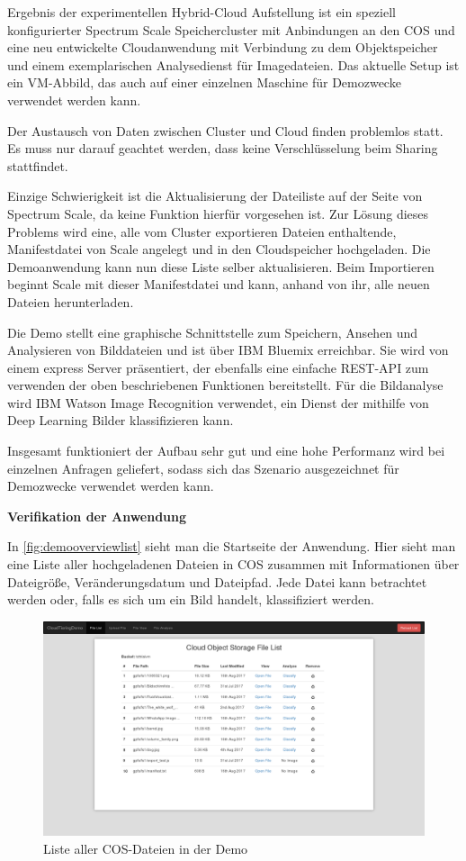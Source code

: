 Ergebnis der experimentellen Hybrid-Cloud Aufstellung ist ein speziell konfigurierter Spectrum Scale Speichercluster mit Anbindungen an den \ac{COS} und eine neu entwickelte Cloudanwendung mit Verbindung zu dem Objektspeicher und einem exemplarischen Analysedienst für Imagedateien.
Das aktuelle Setup ist ein VM-Abbild, das auch auf einer einzelnen Maschine für Demozwecke verwendet werden kann.

Der Austausch von Daten zwischen Cluster und Cloud finden problemlos statt. Es muss nur darauf geachtet werden, dass keine Verschlüsselung beim Sharing stattfindet.

Einzige Schwierigkeit ist die Aktualisierung der Dateiliste auf der Seite von Spectrum Scale, da keine Funktion hierfür vorgesehen ist. Zur Lösung dieses Problems wird eine, alle vom Cluster exportieren Dateien enthaltende, Manifestdatei von Scale angelegt und in den Cloudspeicher hochgeladen. Die Demoanwendung kann nun diese Liste selber aktualisieren. Beim Importieren beginnt Scale mit dieser Manifestdatei und kann, anhand von ihr, alle neuen Dateien herunterladen.

Die Demo stellt eine graphische Schnittstelle zum Speichern, Ansehen und Analysieren von Bilddateien und ist über IBM Bluemix erreichbar. Sie wird von einem express Server präsentiert, der ebenfalls eine einfache REST-API zum verwenden der oben beschriebenen Funktionen bereitstellt. Für die Bildanalyse wird IBM Watson Image Recognition verwendet, ein Dienst der mithilfe von Deep Learning Bilder klassifizieren kann.

Insgesamt funktioniert der Aufbau sehr gut und eine hohe Performanz wird bei einzelnen Anfragen geliefert, sodass sich das Szenario ausgezeichnet für Demozwecke verwendet werden kann.

\textbf{Verifikation der Anwendung}

In \autoref{fig:demooverviewlist} sieht man die Startseite der Anwendung. Hier sieht man eine Liste aller hochgeladenen Dateien in \ac{COS} zusammen mit Informationen über Dateigröße, Veränderungsdatum und Dateipfad. Jede Datei kann betrachtet werden oder, falls es sich um ein Bild handelt, klassifiziert werden. 

\begin{figure}[hbt]
	\centering
	\includegraphics[scale=0.25]{images/demo-overview-list}
	\caption{Liste aller COS-Dateien in der Demo}
	\label{fig:demooverviewlist}
\end{figure}

